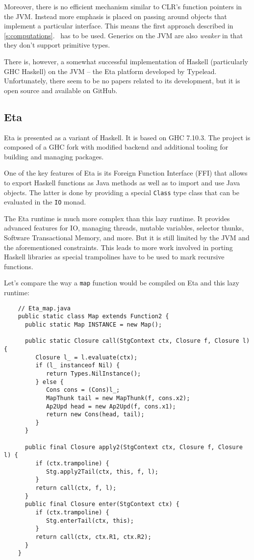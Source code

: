 \documentclass[en]{pracamgr}
\newcommand{\myref}[1]{\ref{#1}.~\textit{\nameref{#1}}}
\begin{document}
Moreover, there is no efficient mechanism similar
to CLR's function pointers in the JVM.
Instead more emphasis is placed on passing around objects
that implement a particular interface.
This means the first approach described in \myref{s:computations}
has to be used.
Generics on the JVM are also \textit{weaker} in that they don't
support primitive types.

There is, however, a somewhat successful implementation of
Haskell (particularly GHC Haskell) on the JVM -- the Eta
platform developed by Typelead. Unfortunately, there seem
to be no papers related to its development, but it is
open source and available on GitHub.

\subsection{Eta}

Eta is presented as a variant of Haskell. It is based on
GHC 7.10.3. The project is composed of a GHC fork with
modified backend and additional tooling for building
and managing packages.

One of the key features of Eta is its Foreign Function Interface (FFI)
that allows to export Haskell functions as Java methods
as well as to import and use Java objects.
The latter is done by providing a special \texttt{Class} type class
that can be evaluated in the \texttt{IO} monad.

The Eta runtime is much more complex than this lazy runtime.
It provides advanced features for IO, managing threads, mutable variables,
selector thunks, Software Transactional Memory, and more.
But it is still limited by the JVM and the aforementioned
constraints. This leads to more work involved in porting
Haskell libraries as special trampolines have to be used
to mark recursive functions.

Let's compare the way a \texttt{map} function would be compiled
on Eta and this lazy runtime:

\begin{verbatim}
    // Eta_map.java
    public static class Map extends Function2 {
      public static Map INSTANCE = new Map();

      public static Closure call(StgContext ctx, Closure f, Closure l) {
         Closure l_ = l.evaluate(ctx);
         if (l_ instanceof Nil) {
            return Types.NilInstance();
         } else {
            Cons cons = (Cons)l_;
            MapThunk tail = new MapThunk(f, cons.x2);
            Ap2Upd head = new Ap2Upd(f, cons.x1);
            return new Cons(head, tail);
         }
      }

      public final Closure apply2(StgContext ctx, Closure f, Closure l) {
         if (ctx.trampoline) {
            Stg.apply2Tail(ctx, this, f, l);
         }
         return call(ctx, f, l);
      }
      public final Closure enter(StgContext ctx) {
         if (ctx.trampoline) {
            Stg.enterTail(ctx, this);
         }
         return call(ctx, ctx.R1, ctx.R2);
      }
    }
\end{verbatim}
\end{document}
